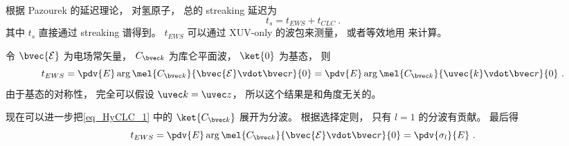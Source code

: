 
\begin{issues}
\issueDraft
\end{issues}


根据 Pazourek 的延迟理论， 对氢原子， 总的 streaking 延迟为
\begin{equation}
t_s = t_{EWS} + t_{CLC}~.
\end{equation}
其中 $t_s$ 直接通过 streaking 谱得到。 $t_{EWS}$ 可以通过 XUV-only 的波包来测量， 或者等效地用 来计算。

令 $\bvec{\mathcal E}$ 为电场常矢量， $C_{\bvec k}$ 为库仑平面波， $\ket{0}$ 为基态， 则
\begin{equation}\label{eq_HyCLC_1}
t_{EWS} = \pdv{E} \arg \mel{C_{\bvec k}}{\bvec{\mathcal E}\vdot \bvec r}{0} = \pdv{E} \arg \mel{C_{\bvec k}}{\uvec{k}\vdot \bvec r}{0}~.
\end{equation}
由于基态的对称性， 完全可以假设 $\uvec k = \uvec z$， 所以这个结果是和角度无关的。

现在可以进一步把\autoref{eq_HyCLC_1} 中的 $\ket{C_{\bvec k}}$ 展开为分波。 根据选择定则， 只有 $l = 1$ 的分波有贡献。 最后得
\begin{equation}\label{eq_HyCLC_2}
t_{EWS} = \pdv{E} \arg \mel{C_{\bvec k}}{\bvec{\mathcal E}\vdot \bvec r}{0} = \pdv{\sigma_l}{E}~.
\end{equation}
